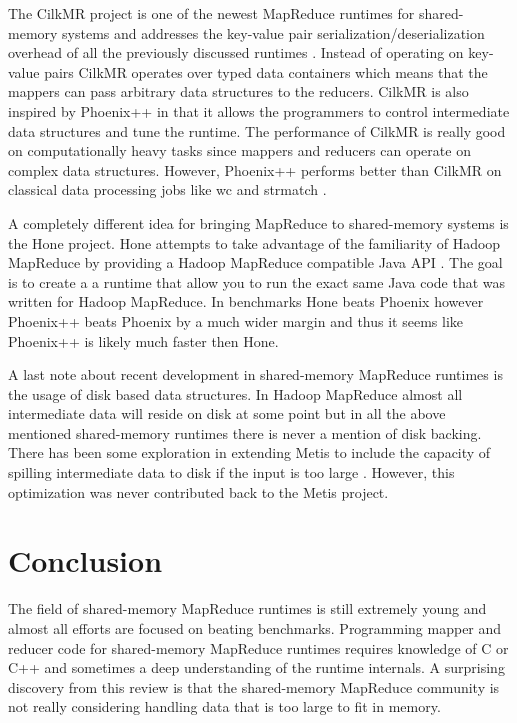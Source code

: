 \documentclass[11pt]{article}       %
\begin{document}
The CilkMR project is one of the newest MapReduce runtimes for shared-memory systems and addresses the key-value pair serialization/deserialization overhead of all the previously discussed runtimes \cite{CilkMR}.
Instead of operating on key-value pairs CilkMR operates over typed data containers which means that the mappers can pass arbitrary data structures to the reducers.
CilkMR is also inspired by Phoenix++ in that it allows the programmers to control intermediate data structures and tune the runtime.
The performance of CilkMR is really good on computationally heavy tasks since mappers and reducers can operate on complex data structures.
However, Phoenix++ performs better than CilkMR on classical data processing jobs like wc and strmatch \cite{CilkMR} \cite{GoogleMapReduce}.

A completely different idea for bringing MapReduce to shared-memory systems is the Hone project.
Hone attempts to take advantage of the familiarity of Hadoop MapReduce by providing a Hadoop MapReduce compatible Java API \cite{ScalingDown}.
The goal is to create a a runtime that allow you to run the exact same Java code that was written for Hadoop MapReduce.
In benchmarks Hone beats Phoenix however Phoenix++ beats Phoenix by a much wider margin and thus it seems like Phoenix++ is likely much faster then Hone.

A last note about recent development in shared-memory MapReduce runtimes is the usage of disk based data structures.
In Hadoop MapReduce almost all intermediate data will reside on disk at some point but in all the above mentioned shared-memory runtimes there is never a mention of disk backing.
There has been some exploration in extending Metis to include the capacity of spilling intermediate data to disk if the input is too large \cite{DiskOptimization}.
However, this optimization was never contributed back to the Metis project.

\section{Conclusion} \label{conclusion}

The field of shared-memory MapReduce runtimes is still extremely young and
almost all efforts are focused on beating benchmarks. Programming mapper and
reducer code for shared-memory MapReduce runtimes requires knowledge of C or C++
and sometimes a deep understanding of the runtime internals. A surprising
discovery from this review is that the shared-memory MapReduce community is not
really considering handling data that is too large to fit in memory.
\end{document}
